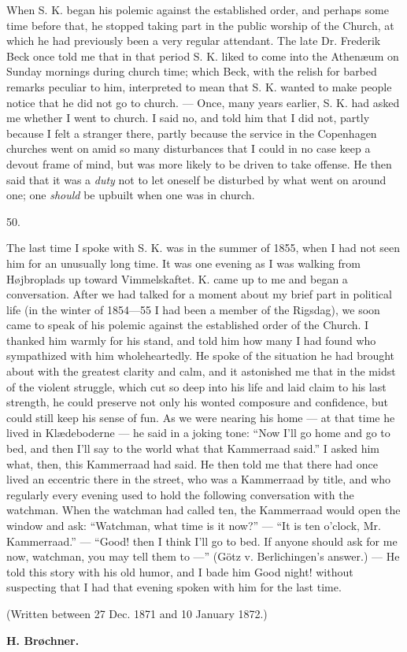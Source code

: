 \documentclass[12pt,a4paper,openany]{book}
\newcommand{\secnum}[1]{\par\begin{center}#1\end{center}\par\nobreak}
\newcommand{\opage}[1]{\marginnote{\footnotesize\textit{[#1]}}}
\begin{document}
When S. K. began his polemic against the established order, and perhaps some
time before that, he stopped taking part in the public worship of the Church,
at which he had previously been a very regular attendant. The late Dr.
Frederik Beck once told me that in that period S. K. liked to come into the
Athenæum on Sunday mornings during church time; which Beck, with the relish
for barbed remarks peculiar to him, interpreted
\opage{373}to mean that S. K. wanted to make people notice that he did not go
to church. --- Once, many years earlier, S. K. had asked me whether I went to
church. I said no, and told him that I did not, partly because I felt a
stranger there, partly because the service in the Copenhagen churches went
on amid so many disturbances that I could in no case keep a devout frame of
mind, but was more likely to be driven to take offense. He then said that it
was a \emph{duty} not to let oneself be disturbed by what went on around one;
one \emph{should} be upbuilt when one was in church.

\secnum{50.}

The last time I spoke with S. K. was in the summer of 1855, when I had not
seen him for an unusually long time. It was one evening as I was walking from
Højbroplads up toward Vimmelskaftet. K. came up to me and began a
conversation. After we had talked for a moment about my brief part in
political life (in the winter of 1854---55 I had been a member of the
Rigsdag), we soon came to speak of his polemic against the established order
of the Church. I thanked him warmly for his stand, and told him how many I
had found who sympathized with him wholeheartedly. He spoke of the situation
he had brought about with the greatest clarity and calm, and it astonished me
that in the midst of the violent struggle, which cut so deep into his life
and laid claim to his last strength, he could preserve not only his wonted
composure and confidence, but could still keep his sense of fun. As we were
nearing his home --- at that time he lived in Klædeboderne --- he said in a
joking tone: ``Now I'll go home and go to bed, and then I'll say to the world
what that Kammerraad said.'' I asked him what, then, this Kammerraad had said.
He then told me that there had once lived an eccentric there in the street,
who was a Kammerraad by title, and who regularly every evening
\opage{374}used to hold the following conversation with the watchman. When
the watchman had called ten, the Kammerraad would open the window and ask:
``Watchman, what time is it now?'' --- ``It is ten o'clock, Mr. Kammerraad.''
--- ``Good! then I think I'll go to bed. If anyone should ask for me now,
watchman, you may tell them to ---''
(Götz v. Berlichingen's answer.) --- He told this story with his old humor,
and I bade him Good night! without suspecting that I had that evening spoken
with him for the last time.

\begin{center}\small (Written between 27 Dec. 1871 and 10 January 1872.)\end{center}

\begin{flushright}\textbf{H. Brøchner.}\end{flushright}
\end{document}

